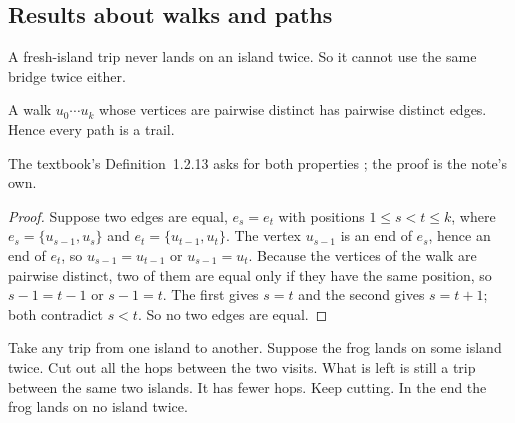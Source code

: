 \subsection{Results about walks and paths}

\plainwords{} A fresh-island trip never lands on an island twice. So it
cannot use the same bridge twice either.

\begin{lemma}\label{lem:distinct}
A walk $u_0\cdots u_k$ whose vertices are pairwise distinct has pairwise
distinct edges. Hence every path is a trail.
\end{lemma}
The textbook's Definition~1.2.13 asks for both properties
\cite[p.~22]{petrosyan2015graphs}; the proof is the note's own.
\begin{proof}
Suppose two edges are equal, $e_s=e_t$ with positions $1\le s<t\le k$,
where $e_s=\{u_{s-1},u_s\}$ and $e_t=\{u_{t-1},u_t\}$. The vertex $u_{s-1}$
is an end of $e_s$, hence an end of $e_t$, so $u_{s-1}=u_{t-1}$ or
$u_{s-1}=u_t$. Because the vertices of the walk are pairwise distinct, two
of them are equal only if they have the same position, so $s-1=t-1$ or
$s-1=t$. The first gives $s=t$ and the second gives $s=t+1$; both contradict
$s<t$. So no two edges are equal.
\end{proof}

\plainwords{} Take any trip from one island to another. Suppose the frog
lands on some island twice. Cut out all the hops between the two visits.
What is left is still a trip between the same two islands. It has fewer
hops. Keep cutting. In the end the frog lands on no island twice.

